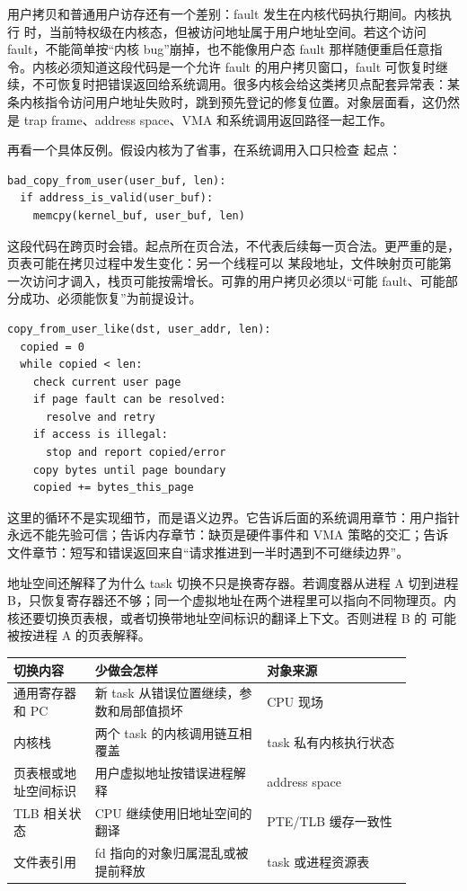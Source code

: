 用户拷贝和普通用户访存还有一个差别：fault 发生在内核代码执行期间。内核执行  时，当前特权级在内核态，但被访问地址属于用户地址空间。若这个访问 fault，不能简单按“内核 bug”崩掉，也不能像用户态 fault 那样随便重启任意指令。内核必须知道这段代码是一个允许 fault 的用户拷贝窗口，fault 可恢复时继续，不可恢复时把错误返回给系统调用。很多内核会给这类拷贝点配套异常表：某条内核指令访问用户地址失败时，跳到预先登记的修复位置。对象层面看，这仍然是 trap frame、address space、VMA 和系统调用返回路径一起工作。

再看一个具体反例。假设内核为了省事，在系统调用入口只检查  起点：

\begin{lstlisting}
bad_copy_from_user(user_buf, len):
  if address_is_valid(user_buf):
    memcpy(kernel_buf, user_buf, len)
\end{lstlisting}

这段代码在跨页时会错。起点所在页合法，不代表后续每一页合法。更严重的是，页表可能在拷贝过程中发生变化：另一个线程可以  某段地址，文件映射页可能第一次访问才调入，栈页可能按需增长。可靠的用户拷贝必须以“可能 fault、可能部分成功、必须能恢复”为前提设计。

\begin{lstlisting}
copy_from_user_like(dst, user_addr, len):
  copied = 0
  while copied < len:
    check current user page
    if page fault can be resolved:
      resolve and retry
    if access is illegal:
      stop and report copied/error
    copy bytes until page boundary
    copied += bytes_this_page
\end{lstlisting}

这里的循环不是实现细节，而是语义边界。它告诉后面的系统调用章节：用户指针永远不能先验可信；告诉内存章节：缺页是硬件事件和 VMA 策略的交汇；告诉文件章节：短写和错误返回来自“请求推进到一半时遇到不可继续边界”。

地址空间还解释了为什么 task 切换不只是换寄存器。若调度器从进程 A 切到进程 B，只恢复寄存器还不够；同一个虚拟地址在两个进程里可以指向不同物理页。内核还要切换页表根，或者切换带地址空间标识的翻译上下文。否则进程 B 的  可能被按进程 A 的页表解释。

\begin{longtable}{p{0.18\linewidth}p{0.38\linewidth}p{0.32\linewidth}}
\toprule
切换内容 & 少做会怎样 & 对象来源 \\
\midrule
通用寄存器和 PC & 新 task 从错误位置继续，参数和局部值损坏 & CPU 现场 \\
内核栈 & 两个 task 的内核调用链互相覆盖 & task 私有内核执行状态 \\
页表根或地址空间标识 & 用户虚拟地址按错误进程解释 & address space \\
TLB 相关状态 & CPU 继续使用旧地址空间的翻译 & PTE/TLB 缓存一致性 \\
文件表引用 & fd 指向的对象归属混乱或被提前释放 & task 或进程资源表 \\
\bottomrule
\end{longtable}

